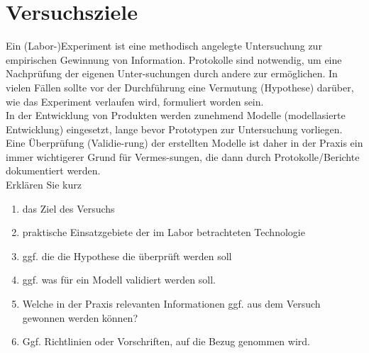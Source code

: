\section{Versuchsziele}

Ein (Labor-)Experiment ist eine methodisch angelegte Untersuchung zur empirischen Gewinnung von Information. Protokolle sind notwendig, um eine Nachprüfung der eigenen Unter-suchungen durch andere zur ermöglichen. In vielen Fällen sollte vor der Durchführung eine Vermutung (Hypothese) darüber, wie das Experiment verlaufen wird, formuliert worden sein.\\

In der Entwicklung von Produkten werden zunehmend Modelle (modellasierte Entwicklung) eingesetzt, lange bevor Prototypen zur Untersuchung vorliegen. Eine Überprüfung (Validie-rung) der erstellten Modelle ist daher in der Praxis ein immer wichtigerer Grund für Vermes-sungen, die dann durch Protokolle/Berichte dokumentiert werden.\\

Erklären Sie kurz
%
\begin{enumerate}
\item das Ziel des Versuchs
\item praktische Einsatzgebiete der im Labor betrachteten Technologie
\item ggf. die die Hypothese die überprüft werden soll
\item ggf. was für ein Modell validiert werden soll.
\item Welche in der Praxis relevanten Informationen ggf. aus dem Versuch gewonnen werden können?
\item Ggf. Richtlinien oder Vorschriften, auf die Bezug genommen wird.
\end{enumerate}
%